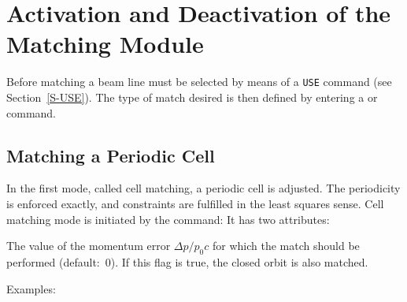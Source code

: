\section{Activation and Deactivation of the Matching Module}
\label{S-MATACT}
Before matching a beam line must be selected by means
of a {\tt USE} command (see Section~\ref{S-USE}).
The type of match desired is then defined by entering
a  or  command.
\subsection{Matching a Periodic Cell}
In the first mode, called cell matching,
a periodic cell is adjusted.
The periodicity is enforced exactly,
and constraints are fulfilled in the least squares sense.
Cell matching mode is initiated by the  command:
It has two attributes:
\begin{mylist}
The value of the momentum error
\(\Delta p/p_0 c\) for which the match should be performed
(default:~0).
If this flag is true, the closed orbit is also matched.
\end{mylist}
Examples:
 
